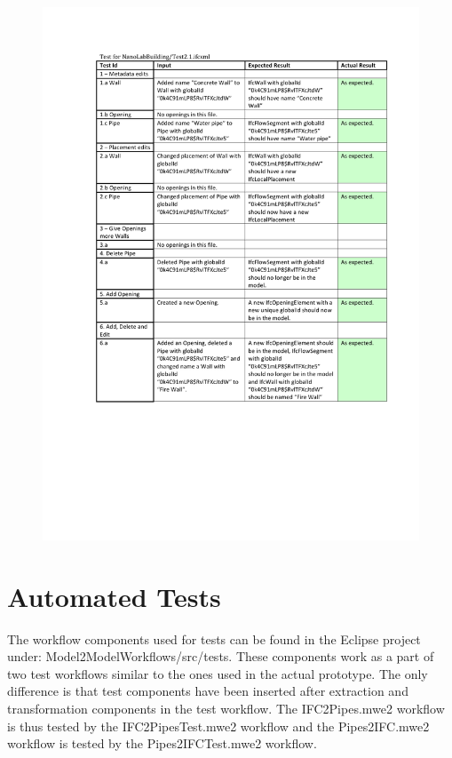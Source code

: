 \begin{figure}
    \centering
        \centerline{\includegraphics[width=150mm]{images/Test4.pdf}}
    \caption{}
    \label{fig:test4}
\end{figure}


\section{Automated Tests}
\label{app:automatedtests}
The workflow components used for tests can be found in the Eclipse project under: Model2ModelWorkflows/src/tests. These components work as a part of two test workflows similar to the ones used in the actual prototype. The only difference is that test components have been inserted after extraction and transformation components in the test workflow. The IFC2Pipes.mwe2 workflow is thus tested by the IFC2PipesTest.mwe2 workflow and the Pipes2IFC.mwe2 workflow is tested by the Pipes2IFCTest.mwe2 workflow.

